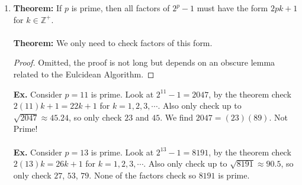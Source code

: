 \documentclass[class=article, crop=false]{standalone}
\def\integers{{\mathbb Z}}
\begin{document}
\begin{enumerate}
\item \textbf{Theorem:} If $p$ is prime, then all factors of $2^p -1$ must have the form
$2pk +1$ for $k\in\integers^+$. \\\\
\textbf{Theorem:} We only need to check factors of this form.
\begin{proof}
	Omitted, the proof is not long but depends on an obscure lemma related to the Eulcidean Algorithm.
\end{proof}
\textbf{Ex.} Consider $p=11$ is prime. Look at $2^{11} -1=2047$,
by the theorem check $2(11)k+1=22k+1$ for $k=1,2,3,\cdots$.
Also only check up to $\sqrt{2047}\approx 45.24$, so only check
$23$ and $45$. We find $2047=(23)(89)$. Not Prime! \\\\
\textbf{Ex.} Consider $p=13$ is prime. Look at $2^{13} -1=8191$,
by the theorem check $2(13)k=26k+1$ for $k=1,2,3,\cdots$.
Also only check up to $\sqrt{8191} \approx 90.5$, so only check
$27$, $53$, $79$. None of the factors check so $8191$ is prime.

\end{enumerate}

\end{document}
